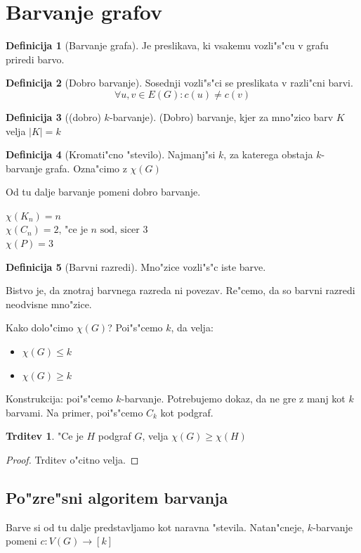 \documentclass{article}
\theoremstyle{definition}
\newtheorem{definition}{Definicija}[section]
\newtheorem{claim}{Trditev}[section]
\begin{document}
	\section{Barvanje grafov}
	\begin{definition}[Barvanje grafa]
		Je preslikava, ki vsakemu vozli"s"cu v grafu priredi barvo.
	\end{definition}
	\begin{definition}[Dobro barvanje]
		Sosednji vozli"s"ci se preslikata v razli"cni barvi.
		$$ \forall u,v \in E(G): c(u) \neq c(v) $$
	\end{definition}
	\begin{definition}[(dobro) $k$-barvanje]
		(Dobro) barvanje, kjer za mno"zico barv $K$ velja $|K| = k$
	\end{definition}
	\begin{definition}[Kromati"cno "stevilo]
		Najmanj"si $k$, za katerega obstaja $k$-barvanje grafa. Ozna"cimo z $\chi(G)$
	\end{definition}
	Od tu dalje barvanje pomeni dobro barvanje.
	
	$\chi(K_n) = n$ \\ $\chi(C_n) = 2\text{, "ce je }n\text{ sod, sicer }3$ \\ $\chi(P) = 3$
	
	\begin{definition}[Barvni razredi]
		Mno"zice vozli"s"c iste barve.
	\end{definition}
	Bistvo je, da znotraj barvnega razreda ni povezav. Re"cemo, da so barvni razredi neodvisne mno"zice.
	
	Kako dolo"cimo $\chi(G)$?
	Poi"s"cemo $k$, da velja:
	\begin{itemize}
		\item $\chi(G) \leq k$
		\item $\chi(G) \geq k$
	\end{itemize}
	Konstrukcija: poi"s"cemo $k$-barvanje. Potrebujemo dokaz, da ne gre z manj kot $k$ barvami. Na primer, poi"s"cemo $C_k$ kot podgraf.
	\begin{claim}
		"Ce je $H$ podgraf $G$, velja $\chi(G) \geq \chi(H)$
		\begin{proof}
			Trditev o"citno velja.
		\end{proof}
	\end{claim}

	\subsection{Po"zre"sni algoritem barvanja}
	Barve si od tu dalje predstavljamo kot naravna "stevila. Natan"cneje, $k$-barvanje pomeni $c: V(G) \rightarrow [k]$
	
\end{document}
